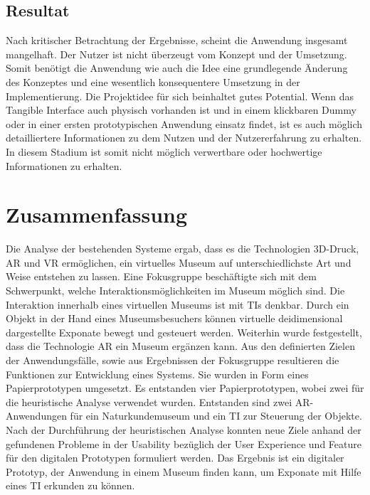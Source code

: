 \documentclass[runningheads,a4paper, 12pt]{llncs}
\begin{document}



\subsection{Resultat}
Nach kritischer Betrachtung der Ergebnisse, scheint die Anwendung insgesamt mangelhaft. Der Nutzer ist nicht überzeugt vom Konzept und der Umsetzung. Somit benötigt die Anwendung wie auch die Idee eine grundlegende Änderung des Konzeptes und eine wesentlich konsequentere Umsetzung in der Implementierung. Die Projektidee für sich beinhaltet gutes Potential. Wenn das Tangible Interface auch physisch vorhanden ist und in einem klickbaren Dummy oder in einer ersten prototypischen Anwendung einsatz findet, ist es auch möglich detailliertere Informationen zu dem Nutzen und der Nutzererfahrung zu erhalten. In diesem Stadium ist somit nicht möglich verwertbare oder hochwertige Informationen zu erhalten.


\section{Zusammenfassung}
Die Analyse der bestehenden Systeme ergab, dass es die Technologien 3D-Druck, AR und VR ermöglichen, ein virtuelles Museum auf unterschiedlichste Art und Weise entstehen zu lassen. Eine Fokusgruppe beschäftigte sich mit dem Schwerpunkt, welche Interaktionsmöglichkeiten im Museum möglich sind. Die Interaktion innerhalb eines virtuellen Museums ist mit TIs denkbar. Durch ein Objekt in der Hand eines Museumsbesuchers können virtuelle deidimensional dargestellte Exponate bewegt und gesteuert werden. Weiterhin wurde festgestellt, dass die Technologie AR ein Museum ergänzen kann. Aus den definierten Zielen der Anwendungsfälle, sowie aus Ergebnissen der Fokusgruppe resultieren die Funktionen zur Entwicklung eines Systems. Sie wurden in Form eines Papierprototypen umgesetzt. Es entstanden vier Papierprototypen, wobei zwei für die heuristische Analyse verwendet wurden. Entstanden sind zwei AR-Anwendungen für ein Naturkundemuseum und ein TI zur Steuerung der Objekte. Nach der Durchführung der heuristischen Analyse konnten neue Ziele anhand der gefundenen  Probleme in der Usability bezüglich der User Experience und Feature für den digitalen Prototypen formuliert werden. Das Ergebnis ist ein digitaler Prototyp, der Anwendung in einem Museum finden kann, um Exponate mit Hilfe eines TI erkunden zu können.\\ 


\newpage
 

\end{document}
